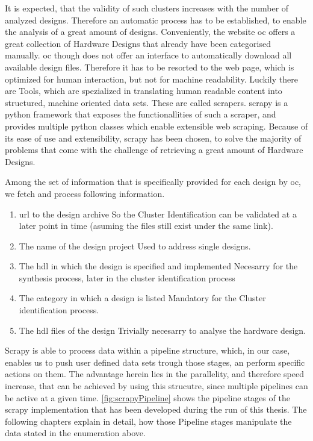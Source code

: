 It is expected, that the validity of such clusters increases with the number of analyzed designs. Therefore an automatic process has to be established, to enable the analysis of a great amount of designs. Conveniently, the website \gls{oc} offers a great collection of Hardware Designs that already have been categorised manually. \gls{oc} though does not offer an interface to automatically download all available design files. Therefore it has to be resorted to the web page, which is optimized for human interaction, but not for machine readability. Luckily there are Tools, which are spezialized in translating human readable content into structured, machine oriented data sets. These are called \glspl{scraper}. \gls{scrapy} is a python framework that exposes the functionallities of such a \gls{scraper}, and provides multiple python classes which enable extensible web scraping. Because of its ease of use and extensibility, \gls{scrapy} has been chosen, to solve the majority of problems that come with the challenge of retrieving a great amount of Hardware Designs.

Among the set of information that is specifically provided for each design by \gls{oc}, we fetch and process following information.  

\begin{enumerate}

	\item{\gls{url} to the design archive}
        So the Cluster Identification can be validated at a later point in time (asuming the files still exist under the same link).

	\item{The name of the design project}
        Used to address single designs. 

	\item{The \gls{hdl} in which the design is specified and implemented}
        Necesarry for the synthesis process, later in the cluster identification process

	\item{The category in which a design is listed}
        Mandatory for the Cluster identification process. 
        
	\item{The \gls{hdl} files of the design}
        Trivially necesarry to analyse the hardware design.
        
\end{enumerate}

Scrapy is able to process data within a pipeline structure, which, in our case, enables us to push user defined data sets trough those stages, an perform specific actions on them. The advantage herein lies in the parallelity, and therefore speed increase, that can be achieved by using this strucutre, since multiple pipelines can be active at a given time. \cref{fig:scrapyPipeline} shows the pipeline stages of the scrapy implementation that has been developed during the run of this thesis.
The following chapters explain in detail, how those Pipeline stages manipulate the data stated in the enumeration above.

